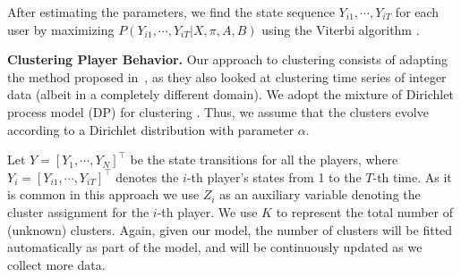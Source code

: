  
After estimating the parameters, we find the state sequence $Y_{i1}, \cdots, Y_{iT}$  
for each user by maximizing $P(Y_{i1}, \cdots, Y_{iT}| X, \pi, A, B)$ using the  Viterbi  algorithm \cite{hmm}. 

{\bf Clustering Player Behavior.}
 Our  approach to clustering consists of  adapting the method proposed in~\cite{moises}, as they also looked at clustering time series of integer data (albeit in a completely different domain). We adopt the mixture of Dirichlet process model (DP) for clustering \cite{dpclustering}.  Thus, we assume that the clusters evolve according to a Dirichlet distribution with parameter $\alpha$.

Let $Y = [Y_1, \cdots, Y_N]^\top$ be the state transitions for all the players,
where $Y_i = [Y_{i1}, \cdots, Y_{iT}]^\top$ denotes the $i$-th player's states from 1 to
the $T$-th time. As it is common in this approach we use $Z_i$ as an auxiliary variable denoting the  cluster assignment for the $i$-th player.  We use  $K$ to represent the total number of (unknown) clusters.  Again, given our model, the number of clusters will be fitted automatically as part of the model, and will be continuously updated as we collect more data. 



